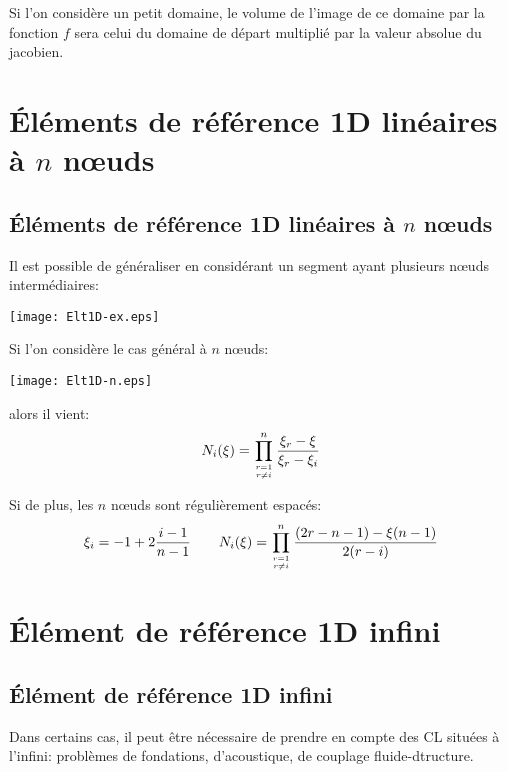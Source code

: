 \medskip
Si l'on considère un \og petit\fg{} domaine, le volume de l'image de ce domaine par la fonction $f$ 
sera celui du domaine de départ multiplié par la valeur absolue du jacobien.




\medskip
\ifVersionAvecExemplesSepares
   \section{Éléments de référence 1D linéaires à $n$ nœuds}
\else
   \subsection{Éléments de référence 1D linéaires à $n$ nœuds}
\fi

Il est possible de généraliser en considérant un segment ayant plusieurs nœuds 
intermédiaires:\\

\centerline{\texttt{[image: Elt1D-ex.eps]}}

\medskip
Si l'on considère le cas général à $n$ nœuds:\\

\centerline{\texttt{[image: Elt1D-n.eps]}}

alors il vient:
\begin{equation} N_i(\xi) = \prod_{r=1\atop r\ne i}^n \dfrac{\xi_r-\xi}{\xi_r-\xi_i} \end{equation}

\medskip
Si de plus, les $n$ nœuds sont régulièrement espacés:
\begin{equation}\xi_i = -1+2\frac{i-1}{n-1} \qquad
N_i(\xi) = \prod_{r=1\atop r\ne i}^n \dfrac{(2r-n-1)-\xi(n-1)}{2(r-i)} \end{equation}





\medskip
\ifVersionAvecExemplesSepares
   \section{Élément de référence 1D infini}
\else
   \subsection{Élément de référence 1D infini}
\fi

Dans certains cas, il peut être nécessaire de prendre en compte des CL situées à
l'infini: problèmes de fondations, d'acoustique, de couplage fluide-dtructure.

